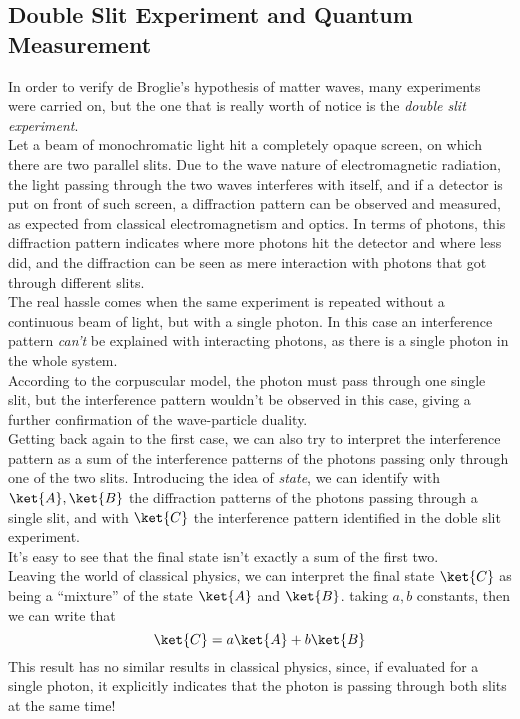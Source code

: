 \documentclass[a4paper, 11pt]{book}
\newcommand{\1}{\opr{\mathds{1}}}
\theoremstyle{plain}
\begin{document}
	\subsection{Double Slit Experiment and Quantum Measurement}
	In order to verify de Broglie's hypothesis of matter waves, many experiments were carried on, but the one that is really worth of notice is the \textit{double slit experiment}.\\
	Let a beam of monochromatic light hit a completely opaque screen, on which there are two parallel slits. Due to the wave nature of electromagnetic radiation, the light passing through the two waves interferes with itself, and if a detector is put on front of such screen, a diffraction pattern can be observed and measured, as expected from classical electromagnetism and optics. In terms of photons, this diffraction pattern indicates where more photons hit the detector and where less did, and the diffraction can be seen as mere interaction with photons that got through different slits.\\
	The real hassle comes when the same experiment is repeated without a continuous beam of light, but with a single photon. In this case an interference pattern \emph{can't} be explained with interacting photons, as there is a single photon in the whole system.\\
	According to the corpuscular model, the photon must pass through one single slit, but the interference pattern wouldn't be observed in this case, giving a further confirmation of the wave-particle duality.\\
	Getting back again to the first case, we can also try to interpret the interference pattern as a sum of the interference patterns of the photons passing only through one of the two slits. Introducing the idea of \textit{state}, we can identify with $\ket{A},\ket{B}$ the diffraction patterns of the photons passing through a single slit, and with $\ket{C}$ the interference pattern identified in the doble slit experiment.\\
	It's easy to see that the final state isn't exactly a sum of the first two.\\
	Leaving the world of classical physics, we can interpret the final state $\ket{C}$ as being a ``mixture'' of the state $\ket{A}$ and $\ket{B}$. taking $a,b$ constants, then we can write that
	\begin{equation*}
		\ket{C}=a\ket{A}+b\ket{B}
	\end{equation*}
	This result has no similar results in classical physics, since, if evaluated for a single photon, it explicitly indicates that the photon is passing through both slits at the same time!\\
\end{document}
